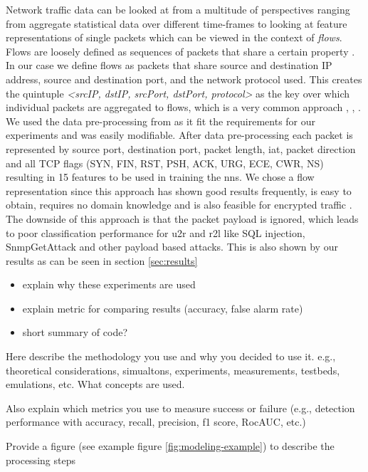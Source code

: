 Network traffic data can be looked at from a multitude of perspectives ranging from aggregate statistical data over different time-frames \cite{kitsune} to looking at feature representations of single packets which can be viewed in the context of \textit{flows}. Flows are loosely defined as sequences of packets that share a certain property \cite{adversarial_recurrent_ids}.  In our case we define flows as packets that share source and destination IP address, source and destination port, and the network protocol used. This creates the quintuple \textit{<srcIP, dstIP, srcPort, dstPort, protocol>} as the key over which individual packets are aggregated to flows, which is a very common approach \cite{caia_vector}, \cite{unsw_nb15}, \cite{feature_vectors}. We used the data pre-processing from \cite{adversarial_recurrent_ids} as it fit the requirements for our experiments and was easily modifiable. After data pre-processing each packet is represented by source port, destination port, packet length, \gls{iat}, packet direction and all TCP flags (SYN, FIN, RST, PSH, ACK, URG, ECE, CWR, NS) resulting in 15 features to be used in training the \glspl{nn}. We chose a flow representation since this approach has shown good results frequently, is easy to obtain, requires no domain knowledge and is also feasible for encrypted traffic \cite{feature_vectors}. The downside of this approach is that the packet payload is ignored, which leads to poor classification performance for \gls{u2r} and \gls{r2l} \cite{nsl_kdd} like SQL injection, SnmpGetAttack and other payload based attacks. This is also shown by our results as can be seen in section \ref{sec:results}

\begin{itemize}
	\item explain why these experiments are used
	\item explain metric for comparing results (accuracy, false alarm rate)
	\item short summary of code?
\end{itemize}

Here describe the methodology you use and why you decided to use it.
e.g., theoretical considerations, simualtons, experiments, measurements, testbeds, emulations, etc. What concepts are used.

Also explain which metrics you use to measure success or failure (e.g., detection performance with accuracy, recall, precision, f1 score, RocAUC, etc.)


Provide a figure (see example figure \ref{fig:modeling-example}) to describe the processing steps

